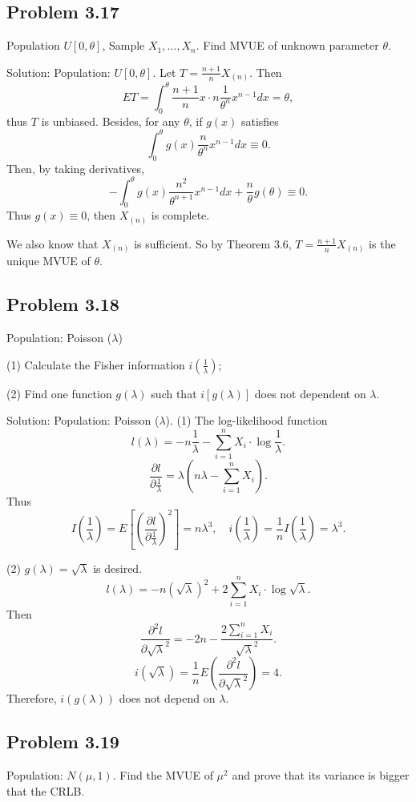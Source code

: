 \subsection*{Problem 3.17}
Population $U[0,\theta]$, Sample $X_{1},\ldots,X_{n}$. Find MVUE of unknown parameter $\theta$.

{Solution:}
Population: $U[0,\theta]$. Let $T=\frac{n+1}{n}X_{(n)}$. Then
\[
ET=\int_{0}^{\theta}\frac{n+1}{n}x\cdot n\frac{1}{\theta^{n}}x^{n-1}dx=\theta,
\]
thus $T$ is unbiased. Besides, for any $\theta$, if $g(x)$ satisfies
\[
\int_{0}^{\theta}g(x)\frac{n}{\theta^{n}}x^{n-1}dx\equiv 0.
\]
Then, by taking derivatives,
\[
-\int_{0}^{\theta}g(x)\frac{n^{2}}{\theta^{n+1}}x^{n-1}dx+\frac{n}{\theta}g(\theta)\equiv 0.
\]
Thus $g(x)\equiv 0$, then $X_{(n)}$ is complete.

We also know that $X_{(n)}$ is sufficient. So by Theorem 3.6, $T=\frac{n+1}{n}X_{(n)}$ is the unique MVUE of $\theta$.

\subsection*{Problem 3.18}
Population: Poisson ($\lambda$)

(1) Calculate the Fisher information $i\left(\frac{1}{\lambda}\right)$;

(2) Find one function $g(\lambda)$ such that $i[g(\lambda)]$ does not dependent on $\lambda$.

{Solution:}
Population: Poisson ($\lambda$). (1) The log-likelihood function
\[
l(\lambda)=-n\frac{1}{\lambda}-\sum_{i=1}^{n}X_{i}\cdot\log\frac{1}{\lambda}.
\]
\[
\frac{\partial l}{\partial\frac{1}{\lambda}}=\lambda\left(n\lambda-\sum_{i=1}^{n}X_{i}\right).
\]
Thus
\[
I\left(\frac{1}{\lambda}\right)=E\left[\left(\frac{\partial l}{\partial\frac{1}{\lambda}}\right)^{2}\right]=n\lambda^{3},\quad i\left(\frac{1}{\lambda}\right)=\frac{1}{n}I\left(\frac{1}{\lambda}\right)=\lambda^{3}.
\]

(2) $g(\lambda)=\sqrt{\lambda}$ is desired.
\[
l(\lambda)=-n(\sqrt{\lambda})^{2}+2\sum_{i=1}^{n}X_{i}\cdot\log\sqrt{\lambda}.
\]
Then
\[
\frac{\partial^{2}l}{\partial\sqrt{\lambda}^{2}}=-2n-\frac{2\sum_{i=1}^{n}X_{i}}{\sqrt{\lambda}^{2}}.
\]
\[
i(\sqrt{\lambda})=\frac{1}{n}E\left(\frac{\partial^{2}l}{\partial\sqrt{\lambda}^{2}}\right)=4.
\]
Therefore, $i(g(\lambda))$ does not depend on $\lambda$.

\subsection*{Problem 3.19}
Population: $N(\mu,1)$. Find the MVUE of $\mu^{2}$ and prove that its variance is bigger that the CRLB.

